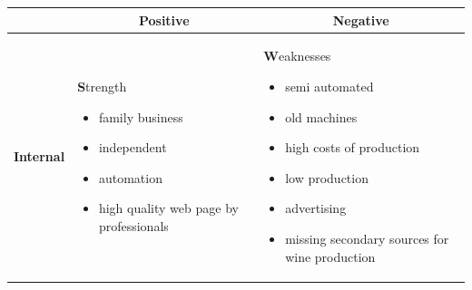 \documentclass[11pt,a4paper]{article}
\begin{document}
\begin{table}[H]
  \begin{center}
    \begin{tabular}{r|p{}|p{}}
        & \multicolumn{1}{c|}{\textbf{\large{Positive}}} & \multicolumn{1}{c}{\textbf{\large{Negative}}}
        \\

        \hline

        \multirow{16}{*}[1em]{\textbf{\large{Internal}}}
        &
        \begin{center}
            \textbf{S}trength
        \end{center}
        \begin{itemize}
            \item family business
            \item independent
            \item automation
            \item high quality web page by professionals
        \end{itemize}
        &
        \begin{center}
            \textbf{W}eaknesses
        \end{center}
        \begin{itemize}
            \item semi automated
            \item old machines
            \item high costs of production
            \item low production
            \item advertising
            \item missing secondary sources for wine production
        \end{itemize}
        \\

        \hline


\end{tabular}
\end{center}
\end{table}
\end{document}
